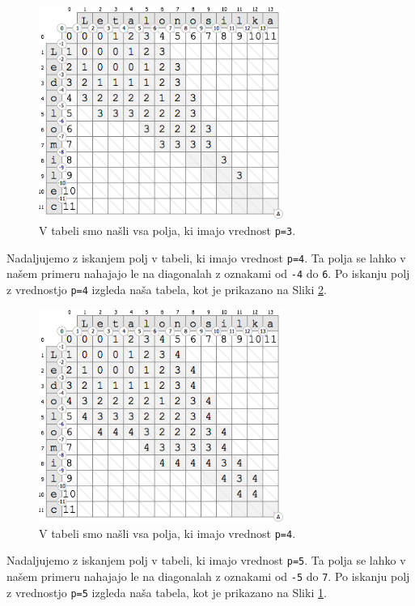 \documentclass[a4paper, 12pt, twoside]{book}
\begin{document}
\begin{figure}[placement h]
\begin{center}
\includegraphics[width=8cm]{ses6.png}
\end{center}
\caption{V tabeli smo našli vsa polja, ki imajo vrednost {\tt p=3}.}
\label{ses6}
\end{figure}

Nadaljujemo z iskanjem polj v tabeli, ki imajo vrednost {\tt p=4}. Ta polja se lahko v našem primeru nahajajo le na diagonalah z oznakami od {\tt -4} do {\tt 6}. Po iskanju polj z vrednostjo {\tt p=4} izgleda naša tabela, kot je prikazano na Sliki \ref{ses7}.

\begin{figure}[placement h]
\begin{center}
\includegraphics[width=8cm]{ses7.png}
\end{center}
\caption{V tabeli smo našli vsa polja, ki imajo vrednost {\tt p=4}.}
\label{ses7}
\end{figure}

\pagebreak

Nadaljujemo z iskanjem polj v tabeli, ki imajo vrednost {\tt p=5}. Ta polja se lahko v našem primeru nahajajo le na diagonalah z oznakami od {\tt -5} do {\tt 7}. Po iskanju polj z vrednostjo {\tt p=5} izgleda naša tabela, kot je prikazano na Sliki \ref{ses6}.
\end{document}
